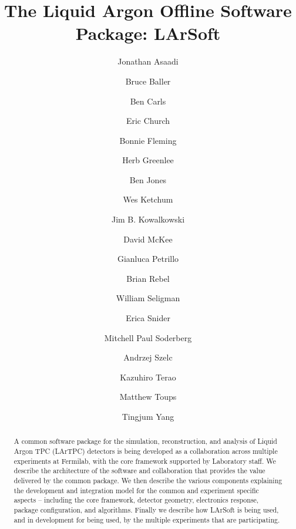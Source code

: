 \documentclass[12pt]{elsarticle}
\begin{document}
\title{The Liquid Argon Offline Software Package: LArSoft} 
\author{Jonathan Asaadi}
\address{}
\author{Bruce Baller}
\address{}
\author{Ben Carls}
\address{}
\author{Eric Church}
\address{Fermi National Accelerator Lab, Batavia, IL, USA, 60510-5011}
\author{Bonnie Fleming}
\address{Physics Department, Yale University, New Haven, CT, USA, 12345-1234}
\author{Herb Greenlee}
\address{Fermi National Accelerator Lab, Batavia, IL, USA, 60510-5011}
\author{Ben Jones}
\address{Massachusetts Institute of Technology, 77 Massachusetts Ave, Cambridge, MA 02139}
\author{Wes Ketchum}
\address{}
\author{Jim B. Kowalkowski}
\address{Fermi National Accelerator Lab, Batavia, IL, USA, 60510-5011}
\author{David McKee}
\address{}

\author{Gianluca Petrillo}
\address{Fermi National Accelerator Lab, Batavia, IL, USA, 60510-5011}
\author{Brian Rebel}
\address{Fermi National Accelerator Lab, Batavia, IL, USA, 60510-5011}
\author{William Seligman}
\address{}
\author{Erica Snider}
\address{Fermi National Accelerator Lab, Batavia, IL, USA, 60510-5011}
\author{Mitchell Paul Soderberg}
\address{Fermi National Accelerator Lab, Batavia, IL, USA, 60510-5011}

\author{Andrzej Szelc}
\address{}

\author{Kazuhiro Terao}
\address{}
\author{Matthew Toups}
\address{}
\author{Tingjum Yang}
\address{Fermi National Accelerator Lab, Batavia, IL, USA, 60510-5011}
\begin{abstract}
A common software package for the simulation, reconstruction, and analysis of Liquid Argon TPC (LArTPC) detectors is being developed as a collaboration across multiple experiments at Fermilab, with the core framework supported by Laboratory staff. We describe the architecture of the software and collaboration that provides the value delivered by the common package. We then describe the various components explaining the development and integration model for the common and experiment specific aspects – including the core framework, detector geometry, electronics response, package configuration, and algorithms. Finally we describe how LArSoft is being used, and in development for being used, by the multiple experiments that are participating.

\end{abstract}
\tableofcontents
\end{document}
